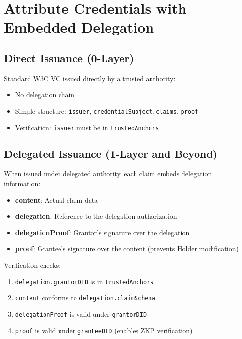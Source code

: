 \section{Attribute Credentials with Embedded Delegation}

\subsection{Direct Issuance (0-Layer)}

Standard W3C VC issued directly by a trusted authority:

\begin{itemize}
  \item No delegation chain
  \item Simple structure: \texttt{issuer}, \texttt{credentialSubject.claims}, \texttt{proof}
  \item Verification: \texttt{issuer} must be in \texttt{trustedAnchors}
\end{itemize}

\subsection{Delegated Issuance (1-Layer and Beyond)}

When issued under delegated authority, each claim embeds delegation information:

\begin{itemize}
  \item \textbf{content}: Actual claim data
  \item \textbf{delegation}: Reference to the delegation authorization
  \item \textbf{delegationProof}: Grantor's signature over the delegation
  \item \textbf{proof}: Grantee's signature over the content (prevents Holder modification)
\end{itemize}

Verification checks:
\begin{enumerate}
  \item \texttt{delegation.grantorDID} is in \texttt{trustedAnchors}
  \item \texttt{content} conforms to \texttt{delegation.claimSchema}
  \item \texttt{delegationProof} is valid under \texttt{grantorDID}
  \item \texttt{proof} is valid under \texttt{granteeDID} (enables ZKP verification)
\end{enumerate}

